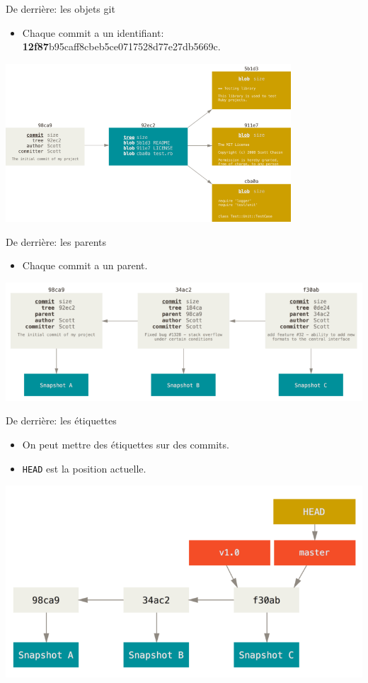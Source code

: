 \documentclass{beamer}
\begin{document}
\begin{frame}{De derrière: les objets git}
    \begin{itemize}
        \item Chaque commit a un identifiant: \textbf{12f87}b95caff8cbeb5ce0717528d77e27db5669c.
    \end{itemize}
    \includegraphics[width=0.8\textwidth]{img/commit-and-tree.png}
\end{frame}

\begin{frame}{De derrière: les parents}
    \begin{itemize}
        \item Chaque commit a un parent.
    \end{itemize}
    \includegraphics[width=\textwidth]{img/commits-and-parents.png}
\end{frame}

\begin{frame}{De derrière: les étiquettes}
    \begin{itemize}
        \item On peut mettre des étiquettes sur des commits.
        \item \texttt{HEAD} est la position actuelle.
    \end{itemize}
    \includegraphics[width=\textwidth]{img/branch-and-history.png}
\end{frame}
\end{document}
